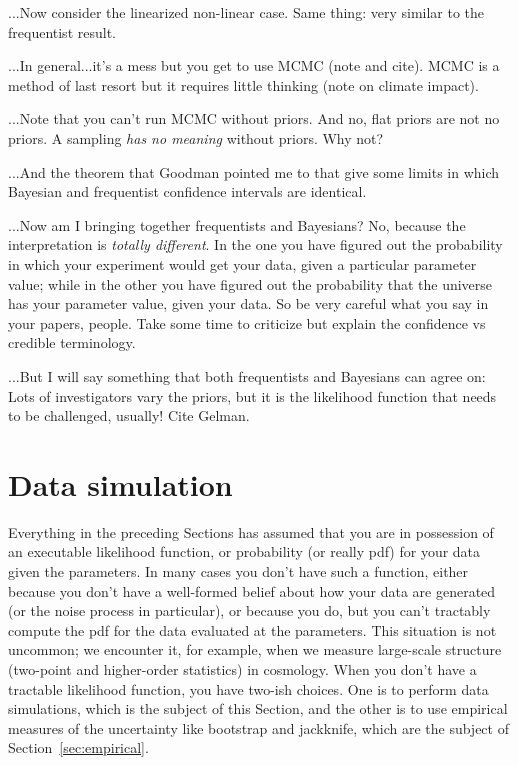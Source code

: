 \documentclass[10pt]{article}
\newcommand{\sectionname}{Section}
\begin{document}
...Now consider the linearized non-linear case. Same thing: very similar to
the frequentist result.

...In general...it's a mess but you get to use MCMC (note and cite). MCMC is a
method of last resort but it requires little thinking (note on climate impact).

...Note that you can't run MCMC without priors. And no, flat priors are not no
priors. A sampling \emph{has no meaning} without priors. Why not?

...And the theorem that Goodman pointed me to that give some limits in which
Bayesian and frequentist confidence intervals are identical.

...Now am I bringing together frequentists and Bayesians? No, because the
interpretation is \emph{totally different}. In the one you have figured out the
probability in which your experiment would get your data, given a particular
parameter value; while in the other you have figured out the probability that
the universe has your parameter value, given your data. So be very careful
what you say in your papers, people. Take some time to criticize but explain the
confidence vs credible terminology.

...But I will say something that both frequentists and Bayesians can agree on:
Lots of investigators vary the priors, but it is the likelihood function
that needs to be challenged, usually! Cite Gelman.

\section{Data simulation}\label{sec:simulation}

Everything in the preceding \sectionname s has assumed that you are in possession
of an executable likelihood function, or probability (or really pdf)
for your data given the parameters.
In many cases you don't have such a function, either because you don't have
a well-formed belief about how your data are generated (or the noise process
in particular), or because you do, but you can't tractably compute the
pdf for the data evaluated at the parameters.
This situation is not uncommon; we encounter it, for example,
when we measure large-scale structure (two-point and higher-order statistics)
in cosmology.
When you don't have a tractable likelihood function, you have two-ish choices.
One is to perform data simulations, which is the subject of this \sectionname,
and the other is to use empirical measures of the uncertainty like bootstrap and
jackknife, which are the subject of \sectionname~\ref{sec:empirical}.
\end{document}
